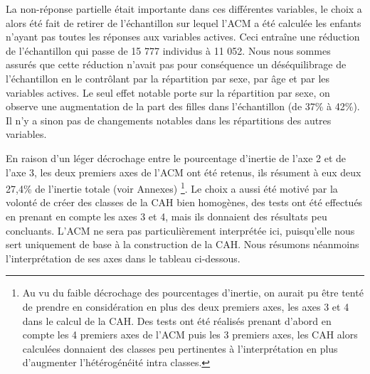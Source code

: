 \documentclass[
  12,
  a4paper,
]{report}
\begin{document}
La non-réponse partielle était importante dans ces différentes
variables, le choix a alors été fait de retirer de l'échantillon sur
lequel l'ACM a été calculée les enfants n'ayant pas toutes les réponses
aux variables actives. Ceci entraîne une réduction de l'échantillon qui
passe de 15 777 individus à 11 052. Nous nous sommes assurés que cette
réduction n'avait pas pour conséquence un déséquilibrage de
l'échantillon en le contrôlant par la répartition par sexe, par âge et
par les variables actives. Le seul effet notable porte sur la
répartition par sexe, on observe une augmentation de la part des filles
dans l'échantillon (de 37\% à 42\%). Il n'y a sinon pas de changements
notables dans les répartitions des autres variables.

En raison d'un léger décrochage entre le pourcentage d'inertie de l'axe
2 et de l'axe 3, les deux premiers axes de l'ACM ont été retenus, ils
résument à eux deux 27,4\% de l'inertie totale (voir Annexes)
\footnote{Au vu du faible décrochage des pourcentages d'inertie, on aurait pu être tenté de prendre en considération en plus des deux premiers axes, les axes 3 et 4 dans le calcul de la CAH. Des tests ont été réalisés prenant d'abord en compte les 4 premiers axes de l'ACM puis les 3 premiers axes, les CAH alors calculées donnaient des classes peu pertinentes à l'interprétation en plus d'augmenter l'hétérogénéité intra classes.}.
Le choix a aussi été motivé par la volonté de créer des classes de la
CAH bien homogènes, des tests ont été effectués en prenant en compte les
axes 3 et 4, mais ils donnaient des résultats peu concluants. L'ACM ne
sera pas particulièrement interprétée ici, puisqu'elle nous sert
uniquement de base à la construction de la CAH. Nous résumons néanmoins
l'interprétation de ses axes dans le tableau ci-dessous.
\end{document}
